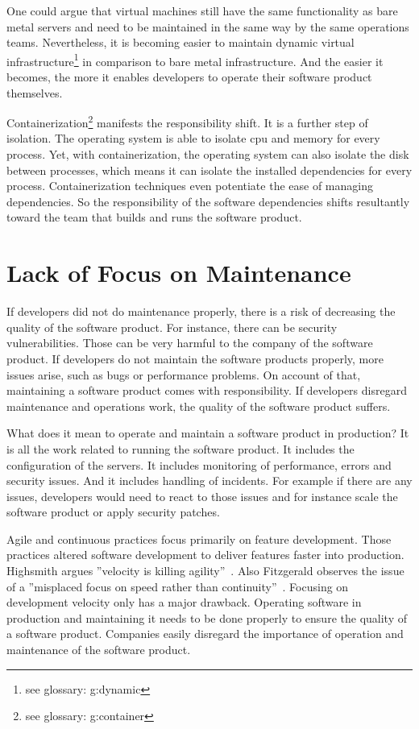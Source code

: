 One could argue that virtual machines still have the same functionality as bare metal
servers and need to be maintained in the same way by the same operations
teams. Nevertheless, it is becoming easier to maintain dynamic virtual
infrastructure\footnote{see glossary: \gls{g:dynamic}} in comparison to bare metal
infrastructure. And the easier it becomes, the more it enables developers to operate their
software product themselves.

Containerization\footnote{see glossary: \gls{g:container}} manifests the responsibility
shift. It is a further step of isolation. The operating system is able to isolate \gls{cpu} and
memory for every process. Yet, with containerization, the operating system can also isolate
the disk between processes, which means it can isolate the installed dependencies for
every process. Containerization techniques even potentiate the ease of managing
dependencies. So the responsibility of the software dependencies shifts resultantly
toward the team that builds and runs the software product.


\section{Lack of Focus on Maintenance}

If developers did not do maintenance properly, there is a risk of decreasing the quality
of the software product. For instance, there can be security vulnerabilities. Those can be
very harmful to the company of the software product. If developers do not maintain the
software products properly, more issues arise, such as bugs or performance problems. On
account of that, maintaining a software product comes with responsibility. If developers
disregard maintenance and operations work, the quality of the software product suffers.

What does it mean to operate and maintain a software product in production? It is all the
work related to running the software product. It includes the configuration of the
servers. It includes monitoring of performance, errors and security issues. And it
includes handling of incidents. For example if there are any issues, developers would need to
react to those issues and for instance scale the software product or apply
security patches.

Agile and continuous practices focus primarily on feature development. Those practices
altered software development to deliver features faster into production. Highsmith argues
”velocity is killing agility”~\cite{velocity_kills}. Also Fitzgerald observes the issue of
a ”misplaced focus on speed rather than continuity”~\cite{continuous_fitzgerald}. Focusing
on development velocity only has a major drawback. Operating software in production and
maintaining it needs to be done properly to ensure the quality of a software
product. Companies easily disregard the importance of operation and maintenance of the
software product.


